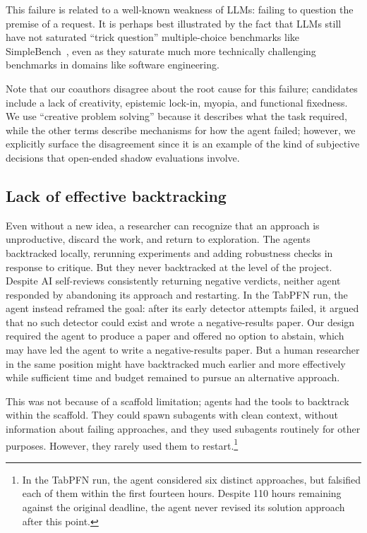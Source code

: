 This failure is related to a well-known weakness of LLMs: failing to question the
premise of a request. It is perhaps best illustrated by the fact that LLMs
still have not saturated ``trick question'' multiple-choice benchmarks like
SimpleBench~\citep{epochsimplebench}, even as they saturate much more technically challenging
benchmarks in domains like software engineering.

Note that our coauthors disagree about the root cause for this failure;
candidates include a lack of creativity, epistemic lock-in, myopia, and
functional fixedness. We use ``creative problem solving'' because it describes
what the task required, while the other terms describe mechanisms for how the
agent failed; however, we explicitly surface the disagreement since it is an
example of the kind of subjective decisions that open-ended shadow evaluations
involve.

\subsection{Lack of effective backtracking}

Even without a new idea, a researcher can recognize that an approach is unproductive, discard the work, and return to exploration. The agents backtracked locally, rerunning experiments and adding robustness checks in response to critique. But they never backtracked at the level of the project. Despite AI self-reviews
consistently returning negative verdicts, neither agent responded by
abandoning its approach and restarting. In the TabPFN run, the agent instead
reframed the goal: after its early detector attempts failed, it argued that no
such detector could exist and wrote a negative-results paper. Our design
required the agent to produce a paper and offered no option to abstain, which
may have led the agent to write a negative-results paper. But a human
researcher in the same position might have backtracked much earlier and more
effectively while sufficient time and budget remained to pursue an alternative
approach.

This was not because of a scaffold limitation; agents had the tools to
backtrack within the scaffold. They could spawn subagents with clean context,
without information about failing approaches, and they used subagents
routinely for other purposes. However, they rarely used them to
restart.\footnote{In the TabPFN run, the agent considered six distinct
approaches, but falsified each of them within the first fourteen hours. Despite 110
hours remaining against the original deadline, the agent never revised its
solution approach after this point.}

